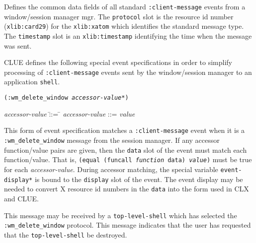 \begin{flushright} \parbox[t]{6.125in}{
Defines the common data fields of all standard {\tt :client-message} events from
a window/session manager mgr. The {\tt protocol} slot is 
the resource id number ({\tt xlib:card29}) for the {\tt xlib:xatom} which
identifies the
standard message type. The {\tt timestamp} slot is an {\tt xlib:timestamp}
identifying the time when the message was sent.

}\end{flushright}



CLUE defines the following special event specifications  in order to simplify processing
of {\tt :client-message} events sent by the window/session manager to an
application {\tt shell}.

\pagebreak
{\samepage
{}
{\tt (:wm\_delete\_window {\em accessor-value}*)}\\
\hspace*{.75in}
\parbox[t]{5.75in}{
\begin{tabbing}
{\em accessor-value} \= ::= \= \kill
{\em accessor-value} \>::=  {\em value} \\
\end{tabbing}}
}
\begin{flushright}
\parbox[t]{5.75in}{
This
form of event specification matches a {\tt :client-message}
event when it is a {\tt :wm\_delete\_window} message from the session manager.
If
any accessor function/value pairs are
given, then the {\tt data} slot of the event must
match each function/value. That is, {\tt (equal (funcall {\em function}
data) {\em value})} must be true for each {\em accessor-value}.
During accessor matching, the special variable {\tt *event-display*} is
bound to the {\tt display} slot of the event. The event display may be
needed to convert X resource id numbers in the {\tt data} into the form
used in CLX and CLUE.}

\parbox[t]{5.75in}{
This message may be received by a {\tt top-level-shell} which has selected the 
{\tt :wm\_delete\_window} protocol. This message indicates that the user has
requested that the {\tt top-level-shell} be destroyed.}
\end{flushright}

